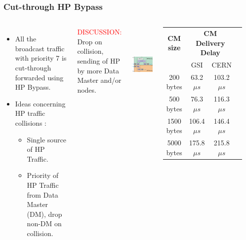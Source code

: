 \documentclass[]{beamer}
\begin{document}
% 
\begin{frame}
  \frametitle{Cut-through HP Bypass}
 
  \begin{columns}[c]
  \column{2.8in}  %
  \begin{itemize}
  \item All the broadcast traffic with priority 7 is cut-through forwarded
        using  HP Bypass.
  \item Ideas concerning HP traffic collisions :
  \begin{itemize}
    \item Single source of HP Traffic.
    \item Priority of HP Traffic from Data Master (DM), drop non-DM on
          collision.
  \end{itemize}
  \end{itemize}
\centering
\textcolor{red}{DISCUSSION:} \\
Drop on collision, sending of HP by more Data Master and/or nodes.

  \column{2.3in}
  \centering
  \includegraphics[height=4cm,keepaspectratio]{robustness/SWhpRouting.jpg}
  {\tiny
  \begin{table}[ht]
	  \begin{tabular}{| c | c | c | c |}          \hline
  \textbf{CM size}& \multicolumn{2}{|c|}{\textbf{CM Delivery Delay}}\\
		&    GSI           & CERN          \\ \hline
  200 bytes      &  63.2$\mu s$     & 103.2$\mu s$    \\ \hline
  500 bytes      &  76.3$\mu s$     & 116.3$\mu s$    \\ \hline
  1500 bytes     & 106.4$\mu s$     & 146.4$\mu s$    \\ \hline
  5000 bytes     & 175.8$\mu s$     & 215.8$\mu s$    \\ \hline
  \end{tabular}
  \label{tab:CMspDelay}
  \end{table}
  }

  \end{columns}

\end{frame}
\end{document}
